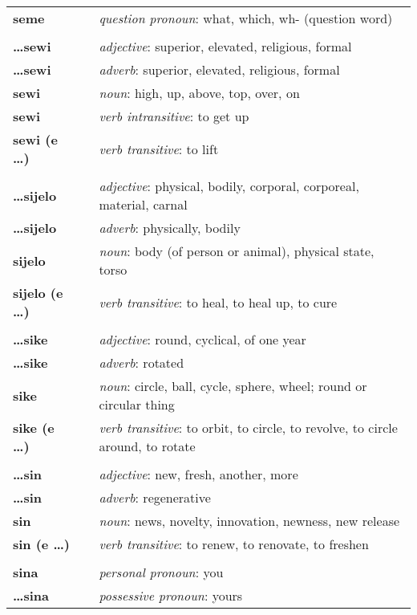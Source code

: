 \begin{supertabular}{p{2,5cm}|ll}
\textbf{seme} && \textit{question pronoun}: what, which, wh- (question word) \\ 
 && \\ %
\textbf{\dots sewi} && \textit{adjective}: superior, elevated, religious, formal \\ 
\textbf{\dots sewi} && \textit{adverb}: superior, elevated, religious, formal \\ 
\textbf{sewi} && \textit{noun}: high, up, above, top, over, on \\ 
\textbf{sewi} && \textit{verb intransitive}: to get up \\ 
\textbf{sewi (e \dots)} && \textit{verb transitive}: to lift \\ 
 && \\ %
\textbf{\dots sijelo} && \textit{adjective}: physical, bodily, corporal, corporeal, material, carnal \\ 
\textbf{\dots sijelo} && \textit{adverb}: physically, bodily \\ 
\textbf{sijelo} && \textit{noun}: body (of person or animal), physical state, torso \\ 
\textbf{sijelo (e \dots)} && \textit{verb transitive}: to heal, to heal up, to cure \\ 
 && \\ %
\textbf{\dots sike} && \textit{adjective}: round, cyclical, of one year \\ 
\textbf{\dots sike} && \textit{adverb}: rotated \\ 
\textbf{sike} && \textit{noun}: circle, ball, cycle, sphere, wheel; round or circular thing \\ 
\textbf{sike (e \dots)} && \textit{verb transitive}: to orbit, to circle, to revolve, to circle around, to rotate \\ 
 && \\ %
\textbf{\dots sin} && \textit{adjective}: new, fresh, another, more \\ 
\textbf{ \dots sin } && \textit{adverb}: regenerative \\ 
\textbf{sin} && \textit{noun}: news, novelty, innovation, newness, new release \\ 
\textbf{sin (e \dots)} && \textit{verb transitive}: to renew, to renovate, to freshen \\ 
 && \\ %
\textbf{sina} && \textit{personal pronoun}: you \\ 
\textbf{\dots sina} && \textit{possessive pronoun}: yours \\  

\end{supertabular}
